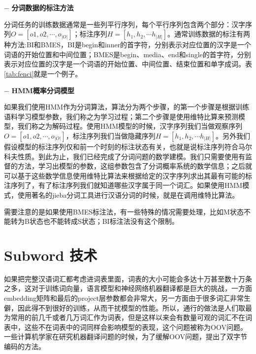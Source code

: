 \documentclass[twoside,a4paper,12pt]{book}%
\begin{document}
$-$ \textbf{分词数据的标注方法}

分词任务的训练数据通常是一些列平行序列，每个平行序列包含两个部分：汉字序列$O=[o1,o2,\cdots,o_{|O|}]$；标注序列$H=[h_1,h_2, \cdots h_{|H|}]$。通常训练数据的标注有两种方法:BI和BMES，BI是begin和inner的首字符，分别表示对应位置的汉字是一个词语的开始位置和中间位置；BMES是begin、media、end和single的首字符，分别表示对应位置的汉字是一个词语的开始位置、中间位置、结束位置和单字成词。表\ref{tab:fenci}就是一个例子。

\begin{table} [h]
    \caption{分词示例}
	\label{tab:fenci}
	\centering
\end{table}  

$-$ \textbf{HMM概率分词模型}

如果我们使用\gls{HMM}作为分词算法，算法分为两个步骤，的第一个步骤是根据训练语料学习模型参数，我们称之为学习过程；第二个步骤是使用维特比算来预测模型，我们称之为解码过程。使用\gls{HMM}模型的时候，汉字序列我们当做观察序列$O=[o1,o2,\cdots,o_{|O|}]$，标注序列我们当做隐藏序列$H=[h_1,h_2, \cdots h_{|H|}]$。另外我们假设模型的标注序列仅和前一个时刻的标注状态有关，也就是说标注序列符合马尔科夫性质。到此为止，我们已经完成了分词问题的数学建模。我们只需要使用有监督的方法，学习出模型的参数，这组参数包含了分词概率系统的数学信息；之后就可以基于这些数学信息使用维特比算法来根据给定的汉字序列求出其最有可能的标注序列了，有了标注序列我们就知道哪些汉字属于同一个词汇。如果使用\gls{HMM}模式，使用著名的jieba分词工具进行汉语分词的时候，就是在调用维特比算法。

需要注意的是如果使用BMES标注法，有一些特殊的情况需要处理，比如M状态不能转为B状态也不能转成S状态；BI标注法没有这个限制。


\section{Subword 技术}
如果把完整汉语词汇都考虑进词表里面，词表的大小可能会多达十万甚至数十万条之多，这对于训练词向量，语言模型和神经网络机器翻译都是巨大的挑战，一方面embedding矩阵和最后的project层参数都会非常大，另一方面由于很多词汇非常生僻，因此得不到很好的训练，从而干扰模型的性能。所以，通行的做法是人们取最为常用的前几千或者几万词汇作为词表，但是这样以来会有数量可观的词汇不在词表中，这些不在词表中的词同样会影响模型的表现，这个问题被称为\gls{OOV}问题。一些计算机学家在研究机器翻译问题的时候，为了缓解\gls{OOV}问题，提出了双字节编码的方法。
\end{document}
